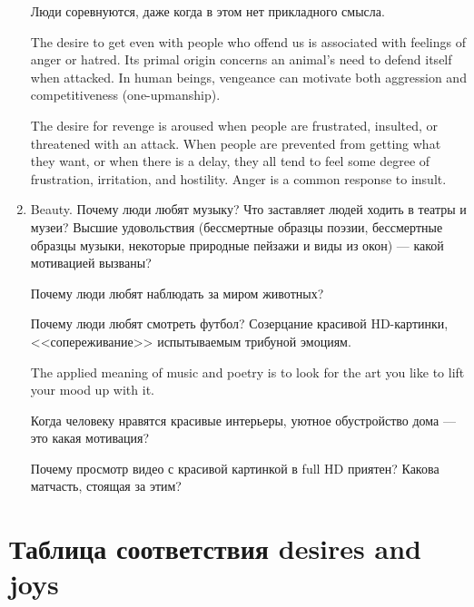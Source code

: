 \documentclass[11pt]{article}
\theoremstyle{remark}
\theoremstyle{definition}
\begin{document}
\begin{enumerate}
Люди соревнуются, даже когда в этом нет прикладного смысла.

The desire to get even with people who offend us is associated with feelings of anger or hatred. Its primal origin concerns an animal’s need to defend itself when attacked. In human beings, vengeance can motivate both aggression and competitiveness (one-upmanship).

The desire for revenge is aroused when people are frustrated, insulted, or threatened with an attack. When people are prevented from getting what they want, or when there is a delay, they all tend to feel some degree of frustration, irritation, and hostility. Anger is a common response to
insult. 

\item Beauty. Почему люди любят музыку? Что заставляет людей ходить в театры и музеи? Высшие удовольствия (бессмертные образцы поэзии, бессмертные образцы музыки, некоторые природные пейзажи и виды из окон) --- какой мотивацией вызваны?

Почему люди любят наблюдать за миром животных?

Почему люди любят смотреть футбол? Созерцание красивой HD-картинки, <<сопереживание>> испытываемым трибуной эмоциям.

The applied meaning of music and poetry is to look for the art you like to lift your mood up with it.


Когда человеку нравятся красивые интерьеры, уютное обустройство дома --- это какая мотивация?

Почему просмотр видео с красивой картинкой в full HD приятен? Какова матчасть, стоящая за этим?



\end{enumerate}

\section{Таблица соответствия desires and joys}
\end{document}
